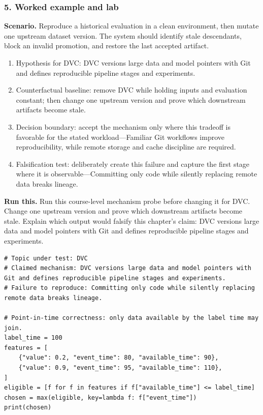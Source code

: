 \subsubsection*{5. Worked example and lab}
\textbf{Scenario.} Reproduce a historical evaluation in a clean environment, then mutate one upstream dataset version. The system should identify stale descendants, block an invalid promotion, and restore the last accepted artifact.
\begin{enumerate}
\item Hypothesis for DVC: DVC versions large data and model pointers with Git and defines reproducible pipeline stages and experiments.
\item Counterfactual baseline: remove DVC while holding inputs and evaluation constant; then change one upstream version and prove which downstream artifacts become stale.
\item Decision boundary: accept the mechanism only where this tradeoff is favorable for the stated workload—Familiar Git workflows improve reproducibility, while remote storage and cache discipline are required.
\item Falsification test: deliberately create this failure and capture the first stage where it is observable—Committing only code while silently replacing remote data breaks lineage.
\end{enumerate}
\textbf{Run this.} Run this course-level mechanism probe before changing it for DVC. Change one upstream version and prove which downstream artifacts become stale. Explain which output would falsify this chapter's claim: DVC versions large data and model pointers with Git and defines reproducible pipeline stages and experiments.
\begin{Verbatim}[fontsize=\scriptsize]
# Topic under test: DVC
# Claimed mechanism: DVC versions large data and model pointers with Git and defines reproducible pipeline stages and experiments.
# Failure to reproduce: Committing only code while silently replacing remote data breaks lineage.

# Point-in-time correctness: only data available by the label time may join.
label_time = 100
features = [
    {"value": 0.2, "event_time": 80, "available_time": 90},
    {"value": 0.9, "event_time": 95, "available_time": 110},
]
eligible = [f for f in features if f["available_time"] <= label_time]
chosen = max(eligible, key=lambda f: f["event_time"])
print(chosen)
\end{Verbatim}
